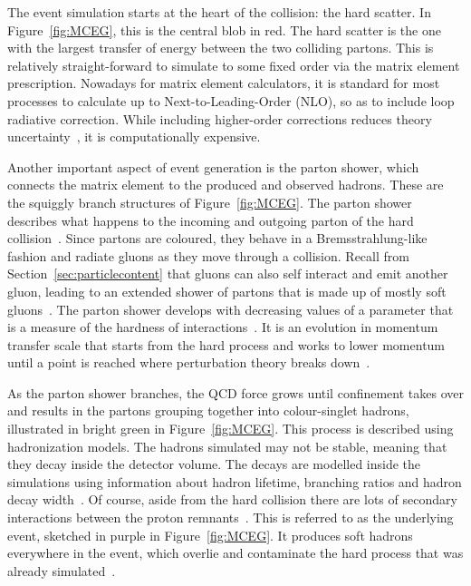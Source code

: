 The event simulation starts at the heart of the collision: the hard scatter. In Figure~\ref{fig:MCEG}, this is the central blob in red. The hard scatter is the one with the largest transfer of energy between the two colliding partons. This is relatively straight-forward to simulate to some fixed order via the matrix element prescription. Nowadays for matrix element calculators, it is standard for most processes to calculate up to Next-to-Leading-Order (NLO), so as to include loop radiative correction. While including higher-order corrections reduces theory uncertainty~\cite{gutschow_lecture}, it is  computationally expensive.

Another important aspect of event generation is the parton shower, which connects the matrix element to the produced and observed hadrons. These are the squiggly branch structures of Figure~\ref{fig:MCEG}. The parton shower describes what happens to the incoming and outgoing parton of the hard collision~\cite{seymour2013monte}. Since partons are coloured, they behave in a Bremsstrahlung-like fashion and radiate gluons as they move through a collision. Recall from Section~\ref{sec:particlecontent} that gluons can also self interact and emit another gluon, leading to an extended shower of partons that is made up of mostly soft gluons~\cite{seymour2013monte}. The parton shower develops with decreasing values of a parameter that is a
measure of the hardness of interactions~\cite{Nagy:98014034}. It is an evolution in momentum transfer scale that starts from the hard process and works to lower momentum until a point is reached where perturbation theory breaks down~\cite{seymour2013monte}. 

As the parton shower branches, the QCD force grows until confinement takes over and results in the partons grouping together into colour-singlet hadrons, illustrated in bright green in Figure~\ref{fig:MCEG}. This process is described using hadronization models. The hadrons simulated may not be stable, meaning that they decay inside the detector volume. The decays are modelled inside the simulations using information about hadron lifetime, branching ratios and hadron decay width~\cite{Cabras:2743914}. Of course, aside from the hard collision there are lots of secondary interactions between the proton remnants~\cite{seymour2013monte}. This is referred to as the underlying event, sketched in purple in Figure~\ref{fig:MCEG}. It produces soft hadrons everywhere in the event, which overlie and contaminate the hard process that was already simulated~\cite{seymour2013monte}.

